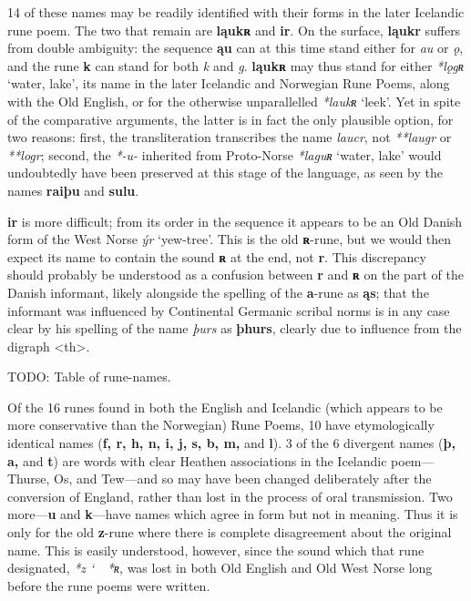 14 of these names may be readily identified with their forms in the later Icelandic rune poem.  The two that remain are \textbf{ląukʀ} and \textbf{ir}.  On the surface, \textbf{ląukr} suffers from double ambiguity: the sequence \textbf{ąu} can at this time stand either for \emph{au} or \emph{ǫ}, and the rune \textbf{k} can stand for both \emph{k} and \emph{g}.  \textbf{ląukʀ} may thus stand for either \emph{*lǫgʀ} ‘water, lake’, its name in the later Icelandic and Norwegian Rune Poems, along with the Old English, or for the otherwise unparallelled \emph{*laukʀ} ‘leek’.
Yet in spite of the comparative arguments, the latter is in fact the only plausible option, for two reasons: first, the transliteration transcribes the name \emph{laucr}, not \emph{**laugr} or \emph{**logr}; second, the \emph{*-u-} inherited from Proto-Norse \emph{*laguʀ} ‘water, lake’ would undoubtedly have been preserved at this stage of the language, as seen by the names \textbf{raiþu} and \textbf{sulu}.%

\textbf{ir} is more difficult; from its order in the sequence it appears to be an Old Danish form of the West Norse \emph{ýr} ‘yew-tree’.  This is the old \textbf{ʀ}-rune, but we would then expect its name to contain the sound \textbf{ʀ} at the end, not \textbf{r}.  This discrepancy should probably be understood as a confusion between \textbf{r} and \textbf{ʀ} on the part of the Danish informant, likely alongside the spelling of the \textbf{a}-rune as \textbf{ąs}; that the informant was influenced by Continental Germanic scribal norms is in any case clear by his spelling of the name \emph{þurs} as \textbf{þhurs}, clearly due to influence from the digraph <th>.

TODO: Table of rune-names.

Of the 16 runes found in both the English and Icelandic (which appears to be more conservative than the Norwegian) Rune Poems, 10 have etymologically identical names (\textbf{f, r, h, n, i, j, s, b, m,} and \textbf{l}).  3 of the 6 divergent names (\textbf{þ, a,} and \textbf{t}) are words with clear Heathen associations in the Icelandic poem---Thurse, Os, and Tew---and so may have been changed deliberately after the conversion of England, rather than lost in the process of oral transmission.  Two more---\textbf{u} and \textbf{k}---have names which agree in form but not in meaning.  Thus it is only for the old \textbf{z}-rune where there is complete disagreement about the original name.  This is easily understood, however, since the sound which that rune designated, \emph{*z \char`~\ *ʀ}, was lost in both Old English and Old West Norse long before the rune poems were written.




